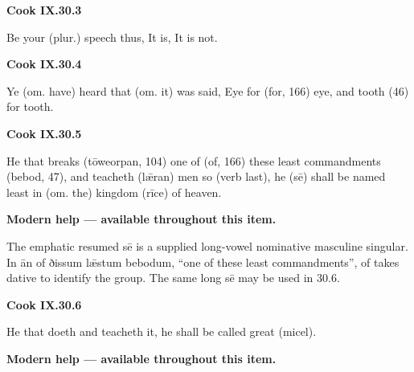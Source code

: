 \par\begin{minipage}{\linewidth}\raggedright
\textbf{Cook IX.30.3}

Be your (plur.) speech thus, It is, It is not.

\end{minipage}\par\addvspace{4pt}

\par\begin{minipage}{\linewidth}\raggedright
\textbf{Cook IX.30.4}

Ye (om. have) heard that (om. it) was said, Eye for (for, 166) eye, and tooth (46) for tooth.

\end{minipage}\par\addvspace{4pt}

\par\begin{minipage}{\linewidth}\raggedright
\textbf{Cook IX.30.5}

He that breaks (tōweorpan, 104) one of (of, 166) these least commandments (bebod, 47), and teacheth (lǣran) men so (verb last), he (sē) shall be named least in (om. the) kingdom (rīce) of heaven.

\textbf{Modern help — available throughout this item.}

\end{minipage}\par\addvspace{4pt}

The emphatic resumed sē is a supplied long-vowel nominative masculine singular. In ān of ðissum lǣstum bebodum, “one of these least commandments”, of takes dative to identify the group. The same long sē may be used in 30.6.

\par\begin{minipage}{\linewidth}\raggedright
\textbf{Cook IX.30.6}

He that doeth and teacheth it, he shall be called great (micel).

\textbf{Modern help — available throughout this item.}

\end{minipage}\par\addvspace{4pt}

